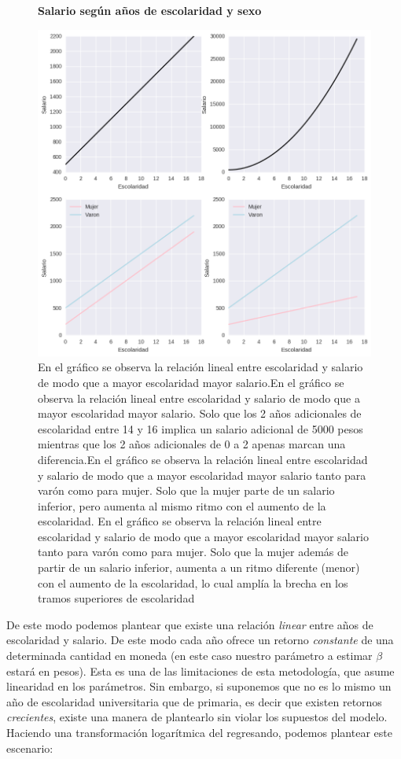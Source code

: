 \begin{figure}[!h]
		\centering
		\textbf{Salario según años de escolaridad y sexo}\par\medskip
		\includegraphics[scale = 0.5]{../img/capitulo2/modelo.png}
		\caption{En el gráfico se observa la relación lineal entre escolaridad y salario de modo que a mayor escolaridad mayor salario.En el gráfico se observa la relación lineal entre escolaridad y salario de modo que a mayor escolaridad mayor salario. Solo que los 2 años adicionales de escolaridad entre 14 y 16 implica un salario adicional de 5000 pesos mientras que los 2 años adicionales de 0 a 2 apenas marcan una diferencia.En el gráfico se observa la relación lineal entre escolaridad y salario de modo que a mayor escolaridad mayor salario tanto para varón como para mujer. Solo que la mujer parte de un salario inferior, pero aumenta al mismo ritmo con el aumento de la escolaridad. En el gráfico se observa la relación lineal entre escolaridad y salario de modo que a mayor escolaridad mayor salario tanto para varón como para mujer. Solo que la mujer además de partir de un salario inferior, aumenta a un ritmo diferente (menor) con el aumento de la escolaridad, lo cual amplía la brecha en los tramos superiores de escolaridad}
\end{figure}

De este modo podemos plantear que existe una relación \textit{linear} entre años de escolaridad y salario. De este modo cada año ofrece un retorno \textit{constante} de una determinada cantidad en moneda (en este caso nuestro parámetro a estimar $\beta$ estará en pesos). Esta es una de las limitaciones de esta metodología, que asume linearidad en los parámetros. Sin embargo, si suponemos que no es lo mismo un año de escolaridad universitaria que de primaria, es decir que existen retornos \textit{crecientes}, existe una manera de plantearlo sin violar los supuestos del modelo. Haciendo una transformación logarítmica del regresando, podemos plantear este escenario:

